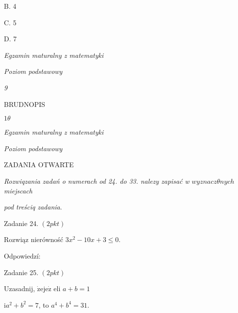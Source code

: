 \documentclass[a4paper,12pt]{article}
\begin{document}
B. 4

C. 5

D. 7





{\it Egzamin maturalny z matematyki}

{\it Poziom podstawowy}

{\it 9}

BRUDNOPIS





$ 1\theta$

{\it Egzamin maturalny z matematyki}

{\it Poziom podstawowy}

ZADANIA OTWARTE

{\it Rozwiqzania zadań o numerach od 24. do 33. nalezy zapisać w} $wyznacz\theta nych$ {\it miejscach}

{\it pod treściq zadania}.

Zadanie 24. $(2pkt)$

Rozwiąz nierówność $3x^{2}-10x+3\leq 0.$

Odpowiedzí:

Zadanie 25. $(2pkt)$

Uzasadnij, $\dot{\mathrm{z}}\mathrm{e}\mathrm{j}\mathrm{e}\dot{\mathrm{z}}$ eli $a+b=1$

$\mathrm{i} a^{2}+b^{2}=7$, to $a^{4}+b^{4}=31.$
\end{document}
